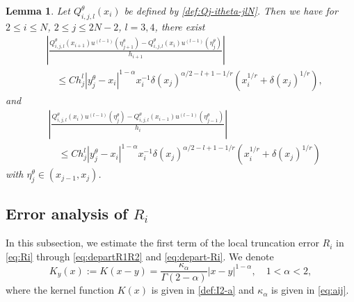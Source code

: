 \documentclass{amsart}
\newtheorem{lemma}[theorem]{Lemma}
\theoremstyle{definition}
\theoremstyle{remark}
\numberwithin{equation}{section}
\begin{document}
  
\begin{lemma} \label{lmm:dQj-itle}
  Let \({Q_{i,j, l}^\theta}(x_i)\) be defined by \eqref{def:Qj-itheta-jlN}. Then we have
  for \(2 \le i \le N\), \(2 \le j \le 2N-2\), \(l=3,4\), there exist
  \begin{equation*}
    \begin{aligned}
      & \left| \frac{{Q_{i,j,l}^\theta}(x_{i+1}) u^{(l-1)}(\eta_{j+1}^\theta) - {Q_{i,j,l}^\theta}(x_{i}) u^{(l-1)}(\eta_{j}^\theta)}{h_{i+1}}\right|  \\
      & \quad \le C h_j^l |y_j^\theta - x_i|^{1-\alpha} x_i^{-1} \delta(x_j)^{\alpha/2-l+1-1/r} (x_i^{1/r} + \delta(x_j)^{1/r}),
    \end{aligned}
  \end{equation*}
  and
  \begin{equation*}
    \begin{aligned}
      & \left| \frac{{Q_{i,j,l}^\theta}(x_{i}) u^{(l-1)}(\eta_{j}^\theta) - {Q_{i,j,l}^\theta}(x_{i-1}) u^{(l-1)}(\eta_{j-1}^\theta)}{h_{i}} \right|  \\
      & \quad \le C h_j^l |y_j^\theta - x_i|^{1-\alpha} x_i^{-1} \delta(x_j)^{\alpha/2-l+1-1/r} (x_i^{1/r} + \delta(x_j)^{1/r})
    \end{aligned}
  \end{equation*}
  with \(\eta_{j}^\theta \in (x_{j-1}, x_{j})\).
\end{lemma}









\subsection{Error analysis of $R_i$}
\label{subsec:proofofRi}
In this subsection, we estimate the first term of the local truncation error $R_i$ in \eqref{eq:Ri} through \eqref{eq:departR1R2} and \eqref{eq:depart-Ri}.
We denote
\begin{equation} \label{def:Kyx}
    K_y(x) := K(x-y) = \frac{\kappa_\alpha}{\Gamma(2-\alpha)} |x - y|^{1-\alpha}, \quad 1<\alpha<2,
\end{equation}
where the kernel function $K(x)$ is given in \eqref{def:I2-a} and $\kappa_\alpha$ is given in \eqref{eq:aij}.
\end{document}
